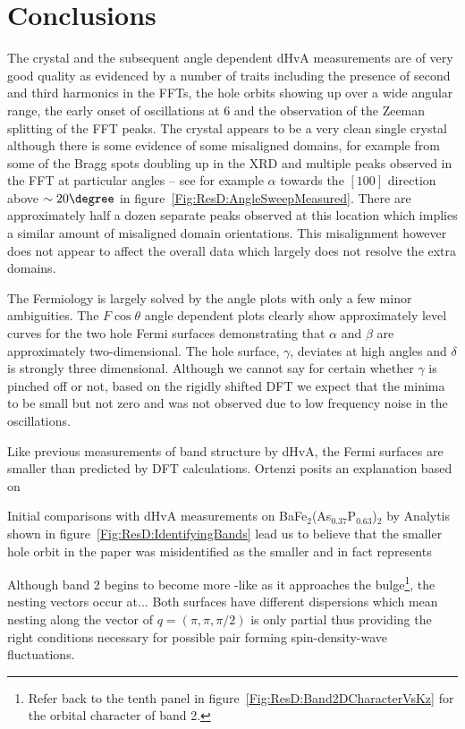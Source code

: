 
\section{Conclusions}

The \BaFeP crystal and the subsequent angle dependent \ac{dHvA} measurements are of very good quality as evidenced by a number of traits including the presence of second and third harmonics in the \acp{FFT}, the hole orbits showing up over a wide angular range, the early onset of oscillations at \unit{6}{\tesla} and the observation of the Zeeman splitting of the \ac{FFT} peaks. The crystal appears to be a very clean single crystal although there is some evidence of some misaligned domains, for example from some of the Bragg spots doubling up in the \ac{XRD} and multiple peaks observed in the \ac{FFT} at particular angles -- see for example $\alpha$ towards the $[100]$ direction above $\sim 20\degree$ in figure~\ref{Fig:ResD:AngleSweepMeasured}. There are approximately half a dozen separate peaks observed at this location which implies a similar amount of misaligned domain orientations. This misalignment however does not appear to affect the overall data which largely does not resolve the extra domains.

The Fermiology is largely solved by the angle plots with only a few minor ambiguities.  The $F\cos \theta$ angle dependent plots clearly show approximately level curves for the two hole Fermi surfaces demonstrating that $\alpha$ and $\beta$ are approximately two-dimensional. The hole surface, $\gamma$, deviates at high angles and $\delta$ is strongly three dimensional. Although we cannot say for certain whether $\gamma$ is pinched off or not, based on the rigidly shifted \ac{DFT} we expect that the minima to be small but not zero and was not observed due to low frequency noise in the oscillations.

Like previous measurements of band structure by \ac{dHvA}, the Fermi surfaces are smaller than predicted by \ac{DFT} calculations\cite{Shishido2010, Analytis2010c}. Ortenzi \etal\cite{Ortenzi2009} posits an explanation based on 


Initial comparisons with \ac{dHvA} measurements on BaFe$_2$(As$_{0.37}$P$_{0.63}$)$_2$ by Analytis \etal shown in figure~\ref{Fig:ResD:IdentifyingBands} lead us to believe that the smaller hole orbit in the paper was misidentified as the smaller and in fact represents


Although band 2 begins to become more \DzTwo-like as it approaches the bulge\footnote{Refer back to the tenth panel in figure~\ref{Fig:ResD:Band2DCharacterVsKz} for the orbital character of band 2.}, the nesting vectors occur at...
Both surfaces have different \kz dispersions which mean nesting along the vector of $q=(\pi, \pi, \pi/2)$ is only partial thus providing the right conditions necessary for possible pair forming spin-density-wave fluctuations. 


